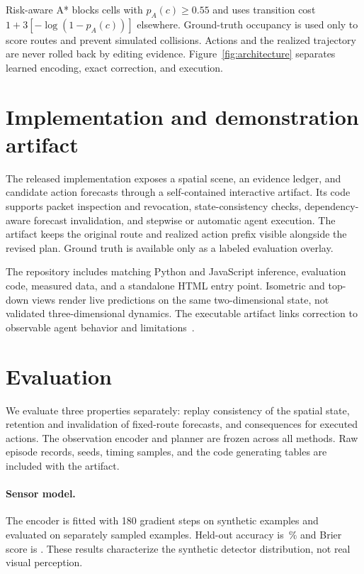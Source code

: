 \documentclass{article}
\begin{document}
Risk-aware A* blocks cells with $p_A(c)\geq0.55$ and uses transition cost $1+3[-\log(1-p_A(c))]$ elsewhere. Ground-truth occupancy is used only to score routes and prevent simulated collisions. Actions and the realized trajectory are never rolled back by editing evidence. Figure~\ref{fig:architecture} separates learned encoding, exact correction, and execution.

\section{Implementation and demonstration artifact}
The released implementation exposes a spatial scene, an evidence ledger, and candidate action forecasts through a self-contained interactive artifact. Its code supports packet inspection and revocation, state-consistency checks, dependency-aware forecast invalidation, and stepwise or automatic agent execution. The artifact keeps the original route and realized action prefix visible alongside the revised plan. Ground truth is available only as a labeled evaluation overlay.

The repository includes matching Python and JavaScript inference, evaluation code, measured data, and a standalone HTML entry point. Isometric and top-down views render live predictions on the same two-dimensional state, not validated three-dimensional dynamics. The executable artifact links correction to observable agent behavior and limitations~\cite{esr2026demo}.

\section{Evaluation}
We evaluate three properties separately: replay consistency of the spatial state, retention and invalidation of fixed-route forecasts, and consequences for executed actions. The observation encoder and planner are frozen across all methods. Raw episode records, seeds, timing samples, and the code generating tables are included with the artifact.

\paragraph{Sensor model.}
The encoder is fitted with 180 gradient steps on \SensorTrainN{} synthetic examples and evaluated on \SensorTestN{} separately sampled examples. Held-out accuracy is \SensorAccuracy\,\% and Brier score is \SensorBrier{}. These results characterize the synthetic detector distribution, not real visual perception.
\end{document}
